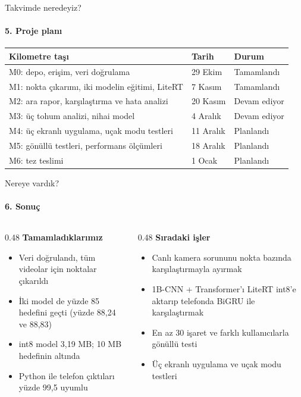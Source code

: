 \documentclass[aspectratio=169,11pt]{beamer}
\begin{document}
\begin{frame}{Takvimde neredeyiz?}
\framesubtitle{5. Proje planı}
\centering
\small
\begin{tabular}{@{}lll@{}}
\toprule
\textbf{Kilometre taşı} & \textbf{Tarih} & \textbf{Durum} \\
\midrule
M0: depo, erişim, veri doğrulama & 29 Ekim & Tamamlandı \\
M1: nokta çıkarımı, iki modelin eğitimi, LiteRT & 7 Kasım & Tamamlandı \\
M2: ara rapor, karşılaştırma ve hata analizi & 20 Kasım & Devam ediyor \\
M3: üç tohum analizi, nihai model & 4 Aralık & Devam ediyor \\
M4: üç ekranlı uygulama, uçak modu testleri & 11 Aralık & Planlandı \\
M5: gönüllü testleri, performans ölçümleri & 18 Aralık & Planlandı \\
M6: tez teslimi & 1 Ocak & Planlandı \\
\bottomrule
\end{tabular}

\end{frame}

\begin{frame}{Nereye vardık?}
\framesubtitle{6. Sonuç}
\begin{columns}[T]
\begin{column}{0.48\textwidth}
\textbf{Tamamladıklarımız}
\begin{itemize}
\item Veri doğrulandı, tüm videolar için noktalar çıkarıldı
\item İki model de yüzde 85 hedefini geçti (yüzde 88,24 ve 88,83)
\item int8 model 3,19 MB; 10 MB hedefinin altında
\item Python ile telefon çıktıları yüzde 99,5 uyumlu
\end{itemize}
\end{column}
\begin{column}{0.48\textwidth}
\textbf{Sıradaki işler}
\begin{itemize}
\item Canlı kamera sorununu nokta bazında karşılaştırmayla ayırmak
\item 1B-CNN + Transformer'ı LiteRT int8'e aktarıp telefonda BiGRU ile karşılaştırmak
\item En az 30 işaret ve farklı kullanıcılarla gönüllü testi
\item Üç ekranlı uygulama ve uçak modu testleri
\end{itemize}
\end{column}
\end{columns}
\end{frame}
\end{document}
